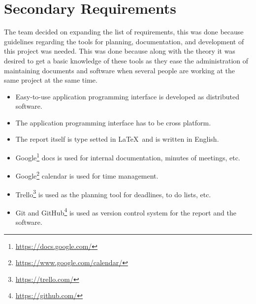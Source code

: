 \section{Secondary Requirements}
The team decided on expanding the list of requirements, this was done because guidelines regarding the tools for planning, documentation, and development of this project was needed. This was done because along with the theory it was desired to get a basic knowledge of these tools as they ease the administration of maintaining documents and software when several people are working at the same project at the same time.

\begin{itemize}
\item Easy-to-use application programming interface is developed as distributed software.
\item The application programming interface has to be cross platform.
\item The report itself is type setted in \LaTeX\ and is written in English.
\item Google\footnote{\url{https://docs.google.com/}} docs is used for internal documentation, minutes of meetings, etc.
\item Google\footnote{\url{https://www.google.com/calendar/}} calendar is used for time management.
\item Trello\footnote{\url{https://trello.com/}} is used as the planning tool for deadlines, to do lists, etc.
\item Git and GitHub\footnote{\url{https://github.com/}} is used as version control system for the report and the software.
\end{itemize}


